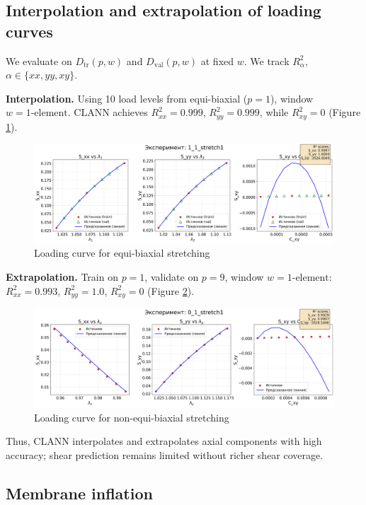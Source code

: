 \subsection{Interpolation and extrapolation of loading curves}
We evaluate on $D_{\mathrm{tr}}(p,w)$ and $D_{\mathrm{val}}(p,w)$ at fixed $w$. We track $R^2_{\alpha}$, $\alpha\in\{xx,yy,xy\}$.

\textbf{Interpolation.}
Using 10 load levels from equi-biaxial ($p=1$), window $w=\text{1-element}$. CLANN achieves $R^2_{xx}=0.999$, $R^2_{yy}=0.999$, while $R^2_{xy}=0$ (Figure \ref{fig:interpolation}).

  \begin{figure}[H]
    \centering
    \includegraphics[width=1.0\textwidth]{../img/interpolation.png}
    \caption{Loading curve for equi-biaxial stretching}
    \label{fig:interpolation}
  \end{figure}
  
  \textbf{Extrapolation.}
  Train on $p=1$, validate on $p=9$, window $w=\text{1-element}$: $R^2_{xx}=0.993$, $R^2_{yy}=1.0$, $R^2_{xy}=0$ (Figure \ref{fig:extrapolation}).

  \begin{figure}[H]
    \centering
    \includegraphics[width=1.0\textwidth]{../img/extrapolation.png}
    \caption{Loading curve for non-equi-biaxial stretching}
    \label{fig:extrapolation}
  \end{figure}
   
  Thus, CLANN interpolates and extrapolates axial components with high accuracy; shear prediction remains limited without richer shear coverage.
\subsection{Membrane inflation}

